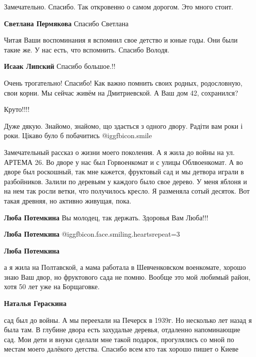 \begin{itemize}
Замечательно. Спасибо. Так откровенно о самом дорогом. Это много стоит.

\textbf{Светлана Пермякова} Спасибо Светлана


Читая Ваши воспоминания я вспомнил свое детство и юные годы. Они были такие же.
У нас есть, что вспомнить. Спасибо Володя.


\textbf{Исаак Липский} Спасибо большое.!!


Очень трогательно! Спасибо! Как важно помнить своих родных, родословную, свои
корни. Мы сейчас живём на Дмитриевской. А Ваш дом 42, сохранился?

Круто!!!!

Дуже дякую.
Знайомо, знайомо, що здається з одного двору.
Радіти вам роки і роки.
Цікаво було б побачитись
 @igg{fbicon.smile} 


Замечательный рассказ о жизни моего поколения. А я жила до войны на ул. АРТЕМА
26. Во дворе у нас был Горвоенкомат и с улицы Облвоенкомат. А во дворе был
роскошный, так мне кажется, фруктовый сад и мы детвора играли в разбойников.
Залили по деревьям у каждого было свое дерево. У меня яблоня и на нем так росли
ветки, что получилось кресло. Я разменяла сотый десяток. Вот такая древняя, но
активно живущая, пока.

\begin{itemize} %
\textbf{Люба Потемкина} Вы молодец, так держать. Здоровья Вам Люба!!!

\textbf{Люба Потемкина}  @igg{fbicon.face.smiling.hearts}{repeat=3} 

\textbf{Люба Потемкина} 

а я жила на Полтавской, а мама работала в Шевченковском военкомате, хорошо знаю
Ваш двор, но фруктового сада не помню. Вообще это мой любимый район, хотя 50
лет уже на Борщаговке.

\textbf{Наталья Гераскина} 

сад был до войны. А мы переехали на Печерск в 1939г. Но несколько лет назад я
была там. В глубине двора есть захудалые деревья, отдаленно напоминающие сад.
Мои дети и внуки сделали мне такой подарок, прогулялисъ со мной по местам моего
далёкого детства. Спасибо всем кто так хорошо пишет о Киеве


\end{itemize}
\end{itemize}
